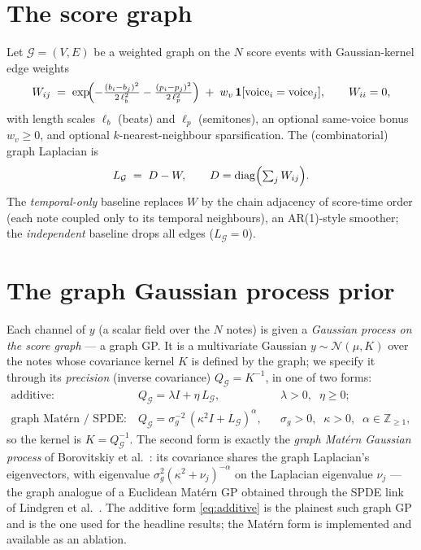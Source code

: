 \documentclass[11pt,a4paper]{report}
\newcommand{\N}{\mathcal{N}}
\newcommand{\graph}{\mathcal{G}}
\newcommand{\Qg}{Q_{\graph}}
\newcommand{\Lg}{L_{\graph}}
\newcommand{\diag}{\operatorname{diag}}
\begin{document}
\section{The score graph}
Let $\graph = (V, E)$ be a weighted graph on the $N$ score events with
Gaussian-kernel edge weights
\begin{equation}
  W_{ij} \;=\; \exp\!\Bigl( -\tfrac{(b_i - b_j)^2}{2\,\ell_b^2} - \tfrac{(p_i - p_j)^2}{2\,\ell_p^2} \Bigr)
  \;+\; w_v\, \mathbf{1}[\text{voice}_i = \text{voice}_j],
  \qquad W_{ii} = 0,
  \label{eq:adjacency}
\end{equation}
with length scales $\ell_b$ (beats) and $\ell_p$ (semitones), an optional same-voice
bonus $w_v \ge 0$, and optional $k$-nearest-neighbour sparsification. The
(combinatorial) graph Laplacian is
\begin{equation}
  \Lg \;=\; D - W, \qquad D = \diag\Bigl(\textstyle\sum_j W_{ij}\Bigr).
  \label{eq:laplacian}
\end{equation}
The \emph{temporal-only} baseline replaces $W$ by the chain adjacency of score-time
order (each note coupled only to its temporal neighbours), an AR(1)-style smoother;
the \emph{independent} baseline drops all edges ($\Lg = 0$).

\section{The graph Gaussian process prior}\label{sec:graphgp}
Each channel of $y$ (a scalar field over the $N$ notes) is given a \emph{Gaussian
process on the score graph} --- a graph GP. It is a multivariate Gaussian
$y \sim \N(\mu, K)$ over the notes whose covariance kernel $K$ is defined by the
graph; we specify it through its \emph{precision} (inverse covariance)
$\Qg = K^{-1}$, in one of two forms:
\begin{align}
  \text{additive:} \quad & \Qg = \lambda I + \eta\, \Lg,
      && \lambda > 0,\;\; \eta \ge 0;
  \label{eq:additive}\\[2pt]
  \text{graph Mat\'ern / SPDE:} \quad & \Qg = \sigma_g^{-2}\,(\kappa^2 I + \Lg)^{\alpha},
      && \sigma_g > 0,\;\; \kappa > 0,\;\; \alpha \in \mathbb{Z}_{\ge 1},
  \label{eq:matern}
\end{align}
so the kernel is $K = \Qg^{-1}$. The second form is exactly the \emph{graph Mat\'ern
Gaussian process} of Borovitskiy et al.\ \cite{borovitskiy2021}: its covariance
shares the graph Laplacian's eigenvectors, with eigenvalue
$\sigma_g^{2}(\kappa^2 + \nu_j)^{-\alpha}$ on the Laplacian eigenvalue $\nu_j$ --- the
graph analogue of a Euclidean Mat\'ern GP obtained through the SPDE link of Lindgren
et al.\ \cite{lindgren2011}. The additive form \eqref{eq:additive} is the plainest
such graph GP and is the one used for the headline results; the Mat\'ern form is
implemented and available as an ablation.
\end{document}
